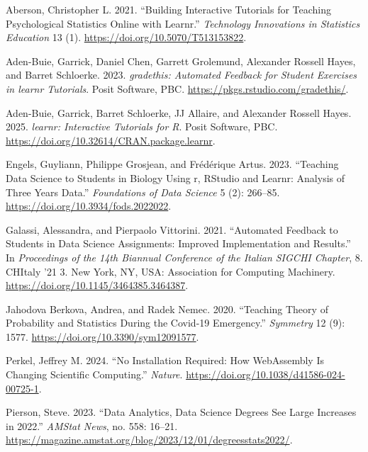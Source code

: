 \documentclass[
  letterpaper,
  DIV=11,
  numbers=noendperiod]{scrartcl}
\newlength{\cslhangindent}
\newenvironment{CSLReferences}[2] %
 {\begin{list}{}{%
  \setlength{\itemindent}{0pt}
  \setlength{\leftmargin}{0pt}
  \setlength{\parsep}{0pt}
  \ifodd #1
   \setlength{\leftmargin}{\cslhangindent}
   \setlength{\itemindent}{-1\cslhangindent}
  \fi
  \setlength{\itemsep}{#2\baselineskip}}}
 {\end{list}}
\begin{document}
\label{refs}
\begin{CSLReferences}{1}{0}
Aberson, Christopher L. 2021. {``Building Interactive Tutorials for
Teaching Psychological Statistics Online with Learnr.''}
\emph{Technology Innovations in Statistics Education} 13 (1).
\url{https://doi.org/10.5070/T513153822}.

Aden-Buie, Garrick, Daniel Chen, Garrett Grolemund, Alexander Rossell
Hayes, and Barret Schloerke. 2023. \emph{{gradethis}: Automated Feedback
for Student Exercises in {learnr} Tutorials}. Posit Software, PBC.
\url{https://pkgs.rstudio.com/gradethis/}.

Aden-Buie, Garrick, Barret Schloerke, JJ Allaire, and Alexander Rossell
Hayes. 2025. \emph{{learnr}: Interactive Tutorials for {R}}. Posit
Software, PBC. \url{https://doi.org/10.32614/CRAN.package.learnr}.

Engels, Guyliann, Philippe Grosjean, and Frédérique Artus. 2023.
{``Teaching Data Science to Students in Biology Using r, RStudio and
Learnr: Analysis of Three Years Data.''} \emph{Foundations of Data
Science} 5 (2): 266--85. \url{https://doi.org/10.3934/fods.2022022}.

Galassi, Alessandra, and Pierpaolo Vittorini. 2021. {``Automated
Feedback to Students in Data Science Assignments: Improved
Implementation and Results.''} In \emph{Proceedings of the 14th Biannual
Conference of the Italian SIGCHI Chapter}, 8. CHItaly '21 3. New York,
NY, USA: Association for Computing Machinery.
\url{https://doi.org/10.1145/3464385.3464387}.

Jahodova Berkova, Andrea, and Radek Nemec. 2020. {``Teaching Theory of
Probability and Statistics During the {C}ovid-19 Emergency.''}
\emph{Symmetry} 12 (9): 1577. \url{https://doi.org/10.3390/sym12091577}.

Perkel, Jeffrey M. 2024. {``No Installation Required: How WebAssembly Is
Changing Scientific Computing.''} \emph{Nature}.
\url{https://doi.org/10.1038/d41586-024-00725-1}.

Pierson, Steve. 2023. {``Data Analytics, Data Science Degrees See Large
Increases in 2022.''} \emph{AMStat News}, no. 558: 16--21.
\url{https://magazine.amstat.org/blog/2023/12/01/degreesstats2022/}.


\end{CSLReferences}
\end{document}
